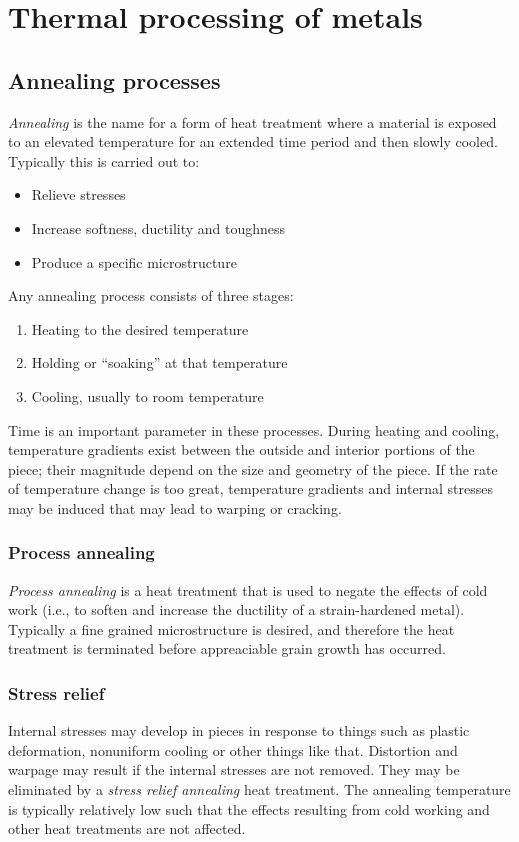 
\section{Thermal processing of metals}

\subsection{Annealing processes}
\textit{Annealing} is the name for a form of heat treatment where a material is exposed to an elevated temperature for an extended time period and then slowly cooled. Typically this is carried out to:
\begin{itemize}
  \item Relieve stresses
  \item Increase softness, ductility and toughness
  \item Produce a specific microstructure
\end{itemize}

Any annealing process consists of three stages:
\begin{enumerate}
  \item Heating to the desired temperature
  \item Holding or ``soaking'' at that temperature
  \item Cooling, usually to room temperature 
\end{enumerate}
Time is an important parameter in these processes. During heating and cooling, temperature gradients exist between the outside and interior portions of the piece; their magnitude depend on the size and geometry of the piece. If the rate of temperature change is too great, temperature gradients and internal stresses may be induced that may lead to warping or cracking.

\subsubsection{Process annealing}
\textit{Process annealing} is a heat treatment that is used to negate the effects of cold work (i.e., to soften and increase the ductility of a strain-hardened metal). Typically a fine grained microstructure is desired, and therefore the heat treatment is terminated before appreaciable grain growth has occurred. 

\subsubsection{Stress relief}
Internal stresses may develop in pieces in response to things such as plastic deformation, nonuniform cooling or other things like that. Distortion and warpage may result if the internal stresses are not removed. They may be eliminated by a \textit{stress relief annealing} heat treatment. The annealing temperature is typically relatively low such that the effects resulting from cold working and other heat treatments are not affected.

